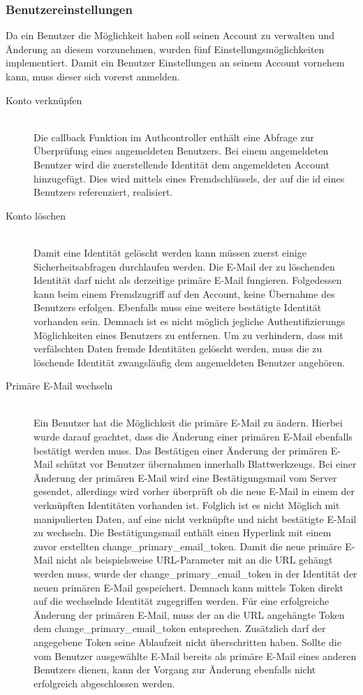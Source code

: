 \subsubsection{Benutzereinstellungen}
\label{sec:server-account-settings}
Da ein Benutzer die Möglichkeit haben soll seinen Account zu verwalten und Änderung an diesem vorzunehmen, wurden fünf Einstellungsmöglichkeiten implementiert. Damit ein Benutzer Einstellungen an seinem Account vornehem kann, muss dieser sich vorerst anmelden.

\begin{description}
	\item[Konto verknüpfen]\hfill\\
	Die callback Funktion im Authcontroller enthält eine Abfrage zur Überprüfung eines angemeldeten Benutzers. Bei einem angemeldeten Benutzer wird die zuerstellende Identität dem angemeldeten Account hinzugefügt. Dies wird mittels eines Fremdschlüssels, der auf die id eines Benutzers referenziert, realisiert.
	\item[Konto löschen]\hfill\\
	Damit eine Identität gelöscht werden kann müssen zuerst einige Sicherheitsabfragen durchlaufen werden. Die E-Mail der zu löschenden Identität darf nicht als derzeitige primäre E-Mail fungieren. Folgedessen kann beim einem Fremdzugriff auf den Account, keine Übernahme des Benutzers erfolgen. Ebenfalls muss eine weitere bestätigte Identität vorhanden sein. Demnach ist es nicht möglich jegliche Authentifizierungs Möglichkeiten eines Benutzers zu entfernen. Um zu verhindern, dass mit verfälschten Daten fremde Identitäten gelöscht werden, muss die zu löschende Identität zwangsläufig dem angemeldeten Benutzer angehören. 
	\item[Primäre E-Mail wechseln]\hfill\\
	Ein Benutzer hat die Möglichkeit die primäre E-Mail zu ändern. Hierbei wurde darauf geachtet, dass die Änderung einer primären E-Mail ebenfalls bestätigt werden muss. Das Bestätigen einer Änderung der primären E-Mail schützt vor Benutzer übernahmen innerhalb Blattwerkzeugs. Bei einer Änderung der primären E-Mail wird eine Bestätigungsmail vom Server gesendet, allerdings wird vorher überprüft ob die neue E-Mail in einem der verknüpften Identitäten vorhanden ist. Folglich ist es nicht Möglich mit manipulierten Daten, auf eine nicht verknüpfte und nicht bestätigte E-Mail zu wechseln. Die Bestätigungsmail enthält einen Hyperlink mit einem zuvor erstellten change\_primary\_email\_token. Damit die neue primäre E-Mail nicht als beispielsweise URL-Parameter mit an die \gls{URL} gehängt werden muss, wurde der change\_primary\_email\_token in der Identität der neuen primären E-Mail gespeichert. Demnach kann mittels Token direkt auf die wechselnde Identität zugegriffen werden. Für eine erfolgreiche Änderung der primären E-Mail, muss der an die \gls{URL} angehängte Token dem change\_primary\_email\_token entsprechen. Zusätzlich darf der angegebene Token seine Ablaufzeit nicht überschritten haben. Sollte die vom Benutzer ausgewählte E-Mail bereits als primäre E-Mail eines anderen Benutzers dienen, kann der Vorgang zur Änderung ebenfalls nicht erfolgreich abgeschlossen werden.

\end{description}
